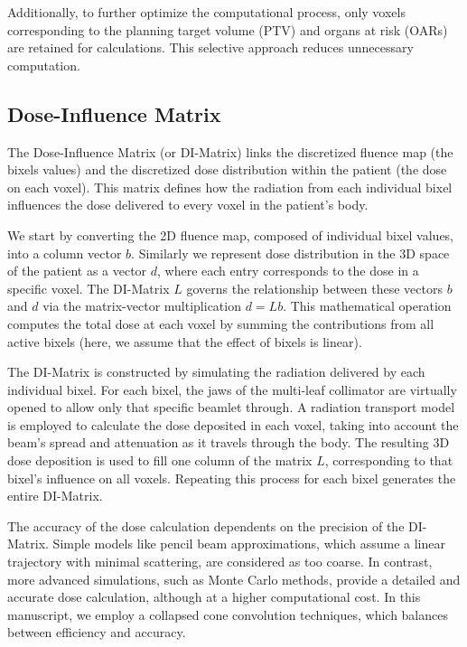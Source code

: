 Additionally, to further optimize the computational process, only voxels corresponding to the planning target volume (PTV) and organs at risk (OARs) are retained for calculations.
This selective approach reduces unnecessary computation.

\subsection[DI-Matrix]{Dose-Influence Matrix}
The Dose-Influence Matrix (or DI-Matrix) links the discretized fluence map (the bixels values) and the discretized dose distribution within the patient (the dose on each voxel).
This matrix defines how the radiation from each individual bixel influences the dose delivered to every voxel in the patient’s body.

We start by converting the 2D fluence map, composed of individual bixel values, into a column vector $b$.
Similarly we represent dose distribution in the 3D space of the patient as a vector $d$, where each entry corresponds to the dose in a specific voxel.
The DI-Matrix $L$ governs the relationship between these vectors $b$ and $d$ via the matrix-vector multiplication $d = Lb$.
This mathematical operation computes the total dose at each voxel by summing the contributions from all active bixels (here, we assume that the effect of bixels is linear).

The DI-Matrix is constructed by simulating the radiation delivered by each individual bixel.
For each bixel, the jaws of the multi-leaf collimator are virtually opened to allow only that specific beamlet through.
A radiation transport model is employed to calculate the dose deposited in each voxel, taking into account the beam's spread and attenuation as it travels through the body.
The resulting 3D dose deposition is used to fill one column of the matrix $L$, corresponding to that bixel's influence on all voxels.
Repeating this process for each bixel generates the entire DI-Matrix.

The accuracy of the dose calculation dependents on the precision of the DI-Matrix.
Simple models like pencil beam approximations, which assume a linear trajectory with minimal scattering, are considered as too coarse.
In contrast, more advanced simulations, such as Monte Carlo methods, provide a detailed and accurate dose calculation, although at a higher computational cost.
In this manuscript, we employ a collapsed cone convolution techniques, which balances between efficiency and accuracy.


